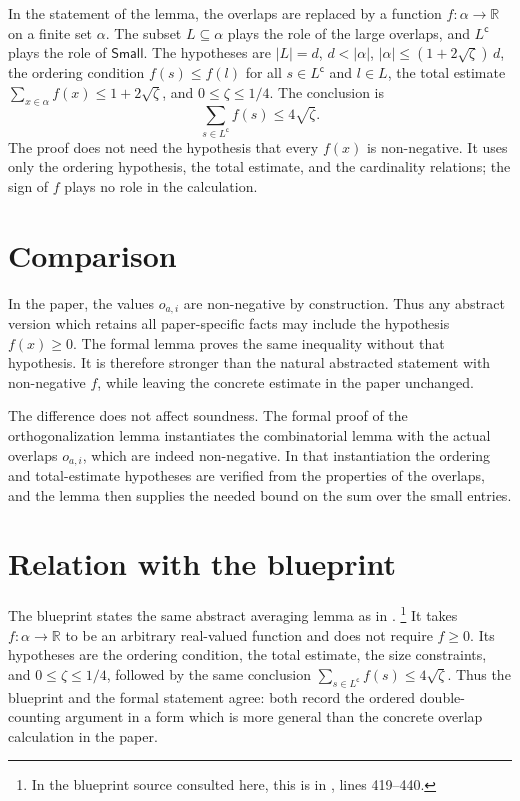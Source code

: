 \documentclass[11pt]{article}
\newcommand{\Small}{\mathsf{Small}}
\begin{document}
In the statement of the lemma, the overlaps are replaced by a function
$f\colon \alpha\to \mathbb{R}$ on a finite set $\alpha$. The subset $L\subseteq\alpha$
plays the role of the large overlaps, and $L^{\mathsf c}$ plays the role of
$\Small$. The hypotheses are $|L|=d$, $d < |\alpha|$,
$|\alpha| \le (1+2\sqrt\zeta)\,d$, the ordering condition
$f(s)\le f(l)$ for all $s\in L^{\mathsf c}$ and $l\in L$, the total estimate
$\sum_{x\in\alpha} f(x) \le 1+2\sqrt\zeta$, and
$0\le \zeta\le 1/4$. The conclusion is
\[
  \sum_{s\in L^{\mathsf c}} f(s) \le 4\sqrt\zeta.
\]
The proof does not need the hypothesis that every $f(x)$ is non-negative. It
uses only the ordering hypothesis, the total estimate, and the cardinality
relations; the sign of $f$ plays no role in the calculation.

\section{Comparison}

In the paper, the values $o_{a,i}$ are non-negative by construction. Thus any
abstract version which retains all paper-specific facts may include the
hypothesis $f(x)\ge 0$. The formal lemma proves the same inequality without that
hypothesis. It is therefore stronger than the natural abstracted statement with
non-negative $f$, while leaving the concrete estimate in the paper unchanged.

The difference does not affect soundness. The formal proof of the
orthogonalization lemma instantiates the combinatorial lemma with the actual
overlaps $o_{a,i}$, which are indeed non-negative. In that instantiation the
ordering and total-estimate hypotheses are verified from the properties of the
overlaps, and the lemma then supplies the needed bound on the sum over the small
entries.

\section{Relation with the blueprint}

The blueprint states the same abstract averaging lemma as
 in
\cite[Chapter~\emph{Making measurements projective}]{MIPStarREBlueprint}.
\footnote{In the blueprint source consulted here, this is in
, lines 419--440.}
It takes $f:\alpha\to \mathbb{R}$ to be an arbitrary real-valued function and
does not require $f\ge 0$. Its hypotheses are the ordering condition, the total
estimate, the size constraints, and $0\le\zeta\le 1/4$, followed by the same
conclusion $\sum_{s\in L^{\mathsf c}}f(s)\le 4\sqrt\zeta$. Thus the
blueprint and the formal statement agree: both record the ordered
double-counting argument in a form which is more general than the concrete
overlap calculation in the paper.
\end{document}
